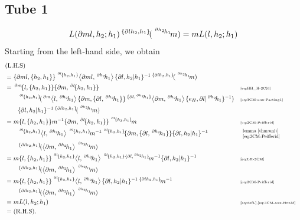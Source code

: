 \documentclass[11pt, reqno]{amsart} %
\newcommand{\act}[1]{\,\sp{#1}\!}
\theoremstyle{definition}
\theoremstyle{remark}
\numberwithin{equation}{section}
\begin{document}
\subsection{Tube 1}
\[
  L(\partial ml,h_2;h_1)\act{\{\partial lh_2,h_1\}}(\act{\act{\partial h_2}h_1}m) = mL(l,h_2;h_1)
\]
Starting from the left-hand side, we obtain
\begin{align*}
  &(\text{L.H.S}) \\
  &= 
  \{\partial ml,\{h_2,h_1\}\}\act{\act{\partial l}\{h_2,h_1\}}\left<\partial ml,\act{\partial h_2}h_1\right>\{\partial l,h_2|h_1\}^{-1}
  \act{\{\partial lh_2,h_1\}}(\act{\act{\partial h_2}h_1}m) \\
  &= \act{\partial m}\{l,\{h_2,h_1\}\}\{\partial m,\act{\partial l}\{h_2,h_1\}\} & &\text{\tiny \eqref{eq:HH_H-2CM}} \\
  &\qquad 
  \act{\act{\partial l}\{h_2,h_1\}}(\act{\partial m}\left<l,\act{\partial h_2}h_1\right>\{\partial m,\{\partial l,\act{\partial h_2}h_1\}\}\act{\{\partial l,\act{\partial h_2}h_1\}}\left<\partial m,\act{\partial h_2}h_1\right>\{e_H,\partial l|\act{\partial h_2}h_1\}^{-1}) & &\text{\tiny \eqref{eq:3CM-aux-Pasting1}} \\
  &\qquad 
  \{\partial l,h_2|h_1\}^{-1}\act{\{\partial lh_2,h_1\}}(\act{\act{\partial h_2}h_1}m) \\
  &= m\{l,\{h_2,h_1\}\}m^{-1}\{\partial m,\act{\partial l}\{h_2,h_1\}\}\act{\act{\partial l}\{h_2,h_1\}}m & &\text{\tiny \eqref{eq:2CM-Peifferid}} \\
  &\qquad 
  \act{\act{\partial l}\{h_2,h_1\}}\left<l,\act{\partial h_2}h_1\right>\act{\act{\partial l}\{h_2,h_1\}}m^{-1}\act{\act{\partial l}\{h_2,h_1\}}\{\partial m,\{\partial l,\act{\partial h_2}h_1\}\}\{\partial l,h_2|h_1\}^{-1} & &\tikz[transform shape, scale=.75,baseline=-2pt,inner sep=0pt]{\node {$\begin{array}{ll}\text{lemma \ref{thm:unit}}\\ \text{\eqref{eq:2CM-Peifferid}}\end{array}$};} \\
  &\qquad 
  \act{\{\partial lh_2,h_1\}}(\left<\partial m,\act{\partial h_2}h_1\right>\act{\act{\partial h_2}h_1}m) \\
  &= m\{l,\{h_2,h_1\}\}\act{\act{\partial l}\{h_2,h_1\}}\left<l,\act{\partial h_2}h_1\right>\act{\act{\partial l}\{h_2,h_1\}\{\partial l,\act{\partial h_2}h_1\}}m^{-1}\{\partial l,h_2|h_1\}^{-1} & &\text{\tiny \eqref{eq:LH-2CM}} \\
  &\qquad 
  \act{\{\partial lh_2,h_1\}}(\left<\partial m,\act{\partial h_2}h_1\right>\act{\act{\partial h_2}h_1}m) \\
  &= m\{l,\{h_2,h_1\}\}\act{\act{\partial l}\{h_2,h_1\}}\left<l,\act{\partial h_2}h_1\right>\{\partial l,h_2|h_1\}^{-1}\act{\{\partial lh_2,h_1\}}m^{-1} & &\text{\tiny \eqref{eq:2CM-Peifferid}} \\
  &\qquad 
  \act{\{\partial lh_2,h_1\}}(\left<\partial m,\act{\partial h_2}h_1\right>\act{\act{\partial h_2}h_1}m) \\
  &= mL(l,h_2;h_1) & &\text{\tiny \eqref{eq:defL},\eqref{eq:3CM-aux-HonM}} \\
  &= (\text{R.H.S}).
\end{align*}
\end{document}
